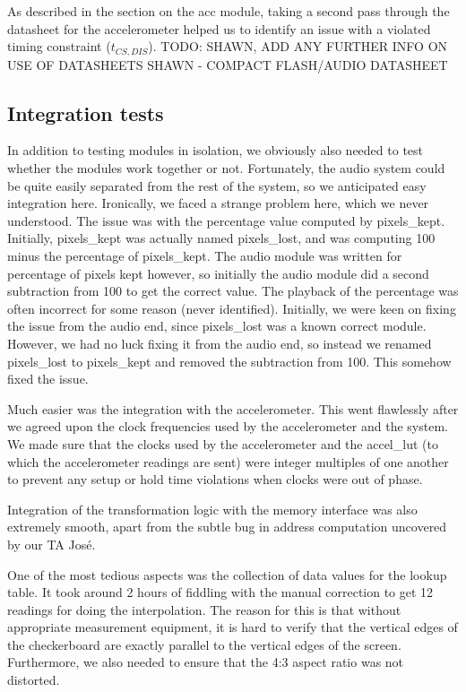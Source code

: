 \documentclass{article}
\begin{document}
As described in the section on the acc module, taking a second pass through the datasheet for the accelerometer helped us to identify an issue with a violated timing constraint ($t_{CS,DIS}$).
TODO: SHAWN, ADD ANY FURTHER INFO ON USE OF DATASHEETS
SHAWN - COMPACT FLASH/AUDIO DATASHEET

\subsection{Integration tests}
In addition to testing modules in isolation, we obviously also needed to test whether the modules work together or not.
Fortunately, the audio system could be quite easily separated from the rest of the system, so we anticipated easy integration here.
Ironically, we faced a strange problem here, which we never understood.
The issue was with the percentage value computed by pixels\_kept.
Initially, pixels\_kept was actually named pixels\_lost, and was computing 100 minus the percentage of pixels\_kept.
The audio module was written for percentage of pixels kept however,
so initially the audio module did a second subtraction from 100 to get the correct value.
The playback of the percentage was often incorrect for some reason (never identified).
Initially, we were keen on fixing the issue from the audio end, since pixels\_lost was a known correct module.
However, we had no luck fixing it from the audio end, so instead we renamed pixels\_lost to pixels\_kept and removed the subtraction from 100.
This somehow fixed the issue.

Much easier was the integration with the accelerometer.
This went flawlessly after we agreed upon the clock frequencies used by the accelerometer and the system. We made sure that the clocks used by the accelerometer and the accel\_lut (to which the accelerometer readings are sent) were integer multiples of one another to prevent any setup or hold time violations when clocks were out of phase.

Integration of the transformation logic with the memory interface was also extremely smooth,
apart from the subtle bug in address computation uncovered by our TA Jos\'{e}.

One of the most tedious aspects was the collection of data values for the lookup table.
It took around 2 hours of fiddling with the manual correction to get 12 readings for doing the interpolation.
The reason for this is that without appropriate measurement equipment,
it is hard to verify that the vertical edges of the checkerboard are exactly parallel to the vertical edges of the screen.
Furthermore, we also needed to ensure that the 4:3 aspect ratio was not distorted.
\end{document}
